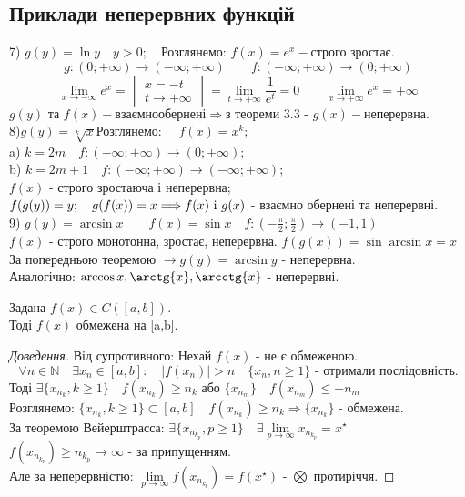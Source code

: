 \documentclass[14pt,a4paper]{scrartcl}
\theoremstyle{definition}
\theoremstyle{remark}
\theoremstyle{definition}
\theoremstyle{definition}
\begin{document}
\subsection{Приклади неперервних функцій}
7) $g(y) = \ln y \quad y > 0; \quad \text{Розглянемо: } f(x) = e^x - \text{строго зростає}.$
$$g: (0; +\infty) \rightarrow (-\infty; + \infty)\qquad f: (-\infty; +\infty) \rightarrow (0; + \infty)$$ $$  \lim\limits_{x\to - \infty}{e^x} = \begin{vmatrix}
  x = -t\\
  t \to + \infty
\end{vmatrix} =  \lim\limits_{t \to  +\infty}{ \frac{1}{e^t} } = 0 \qquad  \lim\limits_{x\to + \infty}{e^x} = + \infty$$ $ g(y) \text{ та } f(x) - \text{взаємнообернені} \Rightarrow \text{з теореми 3.3 - } g(x) - \text{неперервна.}$\\
8)$g(y) = \sqrt[k]{x}$\quad Розглянемо: $\quad f(x) = x^k $;\\
a) $k = 2m \quad f:(-\infty; +\infty) \rightarrow (0; +\infty);$\\
b) $k = 2m+1 \quad  f:(-\infty; +\infty) \rightarrow (-\infty; +\infty);$\\
$f(x)$ - строго зростаюча і неперервна;\quad  $f(g(y)) = y; \quad g(f(x)) = x \Longrightarrow\\ f(x) \text{ i } g(x)$ - взаємно обернені та неперервні.\\
9) $g(y) = \arcsin{x} \qquad f(x) = \sin{x} \quad f: (- \frac{\pi}{2}; \frac{\pi}{2}  ) \rightarrow (-1, 1)$ \\
$f(x)$ - строго монотонна, зростає, неперервна. \quad $f(g(x))=\sin{\arcsin{x}} = x$\\
За попередньою теоремою $\rightarrow g(y) = \arcsin{y}$ - неперервна.\\
Аналогічно: $\arccos{x}, \arctg{x}, \arcctg{x}$ - неперервні.
\begin{boxteo}
Задана $f(x) \in C([a,b])$.\\ Тоді $f(x)$ обмежена на [a,b].
\end{boxteo}
\begin{proof}[Доведення]
  Від супротивного: \quad Нехай $f(x)$ - не є обмеженою.
  $$\forall n \in \mathbb{N} \quad \exists x_n \in [a,b]: \quad \vert f(x_n) \vert > n \quad \lbrace x_n, n \geq 1 \rbrace \text{ - отримали послідовність.} $$
  Тоді \quad $\exists \lbrace x_{n_k}, k \geq 1 \rbrace  \quad f(x_{n_k}) \geq n_k $ або $\lbrace x_{n_m} \rbrace \quad f(x_{n_m}) \leq - n_{m}$\\
  Розглянемо: $\lbrace x_{n_k}, k \geq 1 \rbrace \subset [a,b] \quad f(x_{n_k}) \geq n_k \Rightarrow \lbrace x_{n_k} \rbrace $ - обмежена.\\
  За теоремою Вейерштрасса: \quad $\exists \lbrace x_{n_{k_p}}, p \geq 1 \rbrace \quad \exists  \lim\limits_{p \to  \infty}{x_{n_{k_p}}} =  x^\star $\\
   $f(x_{n_{k_p}}) \geq n_{k_p} \rightarrow \infty$ - за припущенням.\\
   Але за неперервністю: $ \lim\limits_{p\to  \infty}{f(x_{n_{k_p}})} = f(x^\star)$ - $\bigotimes $ протиріччя.
\end{proof}
\end{document}
